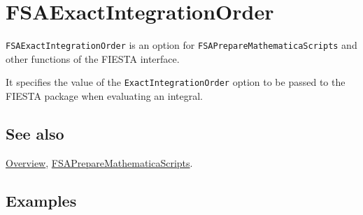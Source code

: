 \documentclass[../FeynHelpersManual.tex]{subfiles}
\begin{document}
\begin{Shaded}
\begin{Highlighting}[]
 
\end{Highlighting}
\end{Shaded}

\hypertarget{fsaexactintegrationorder}{
\section{FSAExactIntegrationOrder}\label{fsaexactintegrationorder}}

\texttt{FSAExactIntegrationOrder} is an option for
\texttt{FSAPrepareMathematicaScripts} and other functions of the FIESTA
interface.

It specifies the value of the \texttt{ExactIntegrationOrder} option to
be passed to the FIESTA package when evaluating an integral.

\subsection{See also}

\hyperlink{toc}{Overview},
\hyperlink{fsapreparemathematicascripts}{FSAPrepareMathematicaScripts}.

\subsection{Examples}
\end{document}
